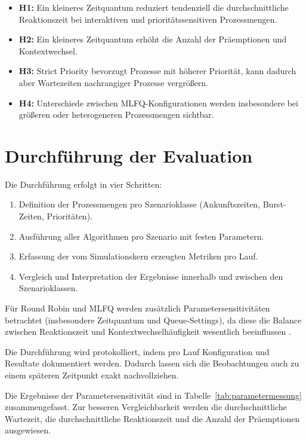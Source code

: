 \begin{itemize}
    \item \textbf{H1:} Ein kleineres Zeitquantum reduziert tendenziell die durchschnittliche Reaktionszeit bei interaktiven und prioritätssensitiven Prozessmengen.
    \item \textbf{H2:} Ein kleineres Zeitquantum erhöht die Anzahl der Präemptionen und Kontextwechsel.
    \item \textbf{H3:} Strict Priority bevorzugt Prozesse mit höherer Priorität, kann dadurch aber Wartezeiten nachrangiger Prozesse vergrößern.
    \item \textbf{H4:} Unterschiede zwischen MLFQ-Konfigurationen werden insbesondere bei größeren oder heterogeneren Prozessmengen sichtbar.
\end{itemize}

\section{Durchführung der Evaluation}

Die Durchführung erfolgt in vier Schritten:

\begin{enumerate}
    \item Definition der Prozessmengen pro Szenarioklasse (Ankunftszeiten, Burst-Zeiten, Prioritäten).
    \item Ausführung aller Algorithmen pro Szenario mit festen Parametern.
    \item Erfassung der vom Simulationskern erzeugten Metriken pro Lauf.
    \item Vergleich und Interpretation der Ergebnisse innerhalb und zwischen den Szenarioklassen.
\end{enumerate}

Für Round Robin und MLFQ werden zusätzlich Parametersensitivitäten betrachtet (insbesondere Zeitquantum und Queue-Settings), da diese die Balance zwischen Reaktionszeit und Kontextwechselhäufigkeit wesentlich beeinflussen \cite{meing2025mlfq,pinedo2016scheduling}.

Die Durchführung wird protokolliert, indem pro Lauf Konfiguration und Resultate dokumentiert werden. Dadurch lassen sich die Beobachtungen auch zu einem späteren Zeitpunkt exakt nachvollziehen.

Die Ergebnisse der Parametersensitivität sind in Tabelle~\ref{tab:parametermessung} zusammengefasst. Zur besseren Vergleichbarkeit werden die durchschnittliche Wartezeit, die durchschnittliche Reaktionszeit und die Anzahl der Präemptionen ausgewiesen.

